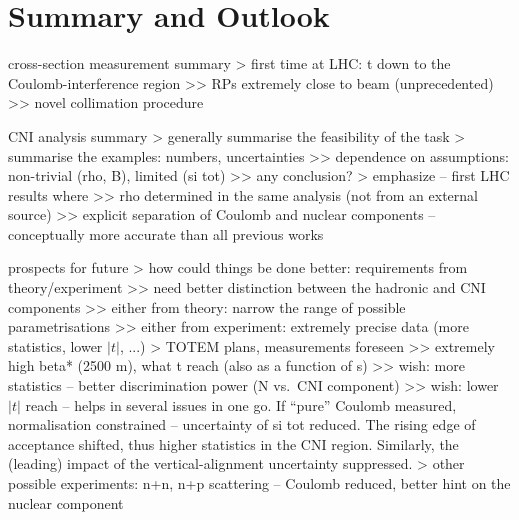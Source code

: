 \section{Summary and Outlook}

\> cross-section measurement summary
\>> first time at LHC: t down to the Coulomb-interference region
\>>> RPs extremely close to beam (unprecedented)
\>>> novel collimation procedure


\> CNI analysis summary
\>> generally summarise the feasibility of the task
\>> summarise the examples: numbers, uncertainties
\>>> dependence on assumptions: non-trivial (rho, B), limited (si tot)
\>>> any conclusion?
\>> emphasize -- first LHC results where
\>>> rho determined in the same analysis (not from an external source)
\>>> explicit separation of Coulomb and nuclear components -- conceptually more accurate than all previous works


\> prospects for future
\>> how could things be done better: requirements from theory/experiment
\>>> need better distinction between the hadronic and CNI components
\>>> either from theory: narrow the range of possible parametrisations
\>>> either from experiment: extremely precise data (more statistics, lower $|t|$, ...)
\>> TOTEM plans, measurements foreseen
\>>> extremely high beta* (2500 m), what t reach (also as a function of s)
\>>> wish: more statistics -- better discrimination power (N vs.~CNI component)
\>>> wish: lower $|t|$ reach -- helps in several issues in one go. If ``pure'' Coulomb measured, normalisation constrained -- uncertainty of si tot reduced. The rising edge of acceptance shifted, thus higher statistics in the CNI region. Similarly, the (leading) impact of the vertical-alignment uncertainty suppressed.
\>> other possible experiments: n+n, n+p scattering -- Coulomb reduced, better hint on the nuclear component
